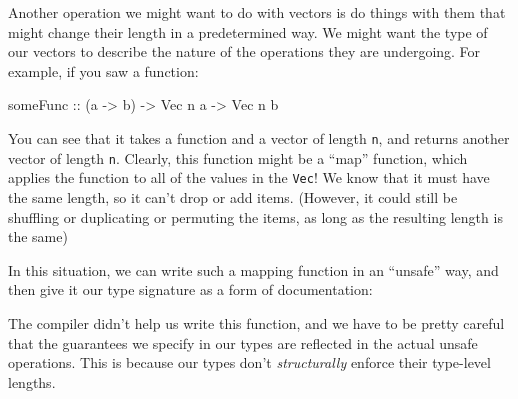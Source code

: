 \documentclass[]{article}
\newenvironment{Shaded}{}{}
\newcommand{\CommentTok}[1]{\textcolor[rgb]{0.38,0.63,0.69}{\textit{#1}}}
\newcommand{\DataTypeTok}[1]{\textcolor[rgb]{0.56,0.13,0.00}{#1}}
\newcommand{\FunctionTok}[1]{\textcolor[rgb]{0.02,0.16,0.49}{#1}}
\newcommand{\KeywordTok}[1]{\textcolor[rgb]{0.00,0.44,0.13}{\textbf{#1}}}
\newcommand{\NormalTok}[1]{#1}
\newcommand{\OperatorTok}[1]{\textcolor[rgb]{0.40,0.40,0.40}{#1}}
\newcommand{\OtherTok}[1]{\textcolor[rgb]{0.00,0.44,0.13}{#1}}
\begin{document}
Another operation we might want to do with vectors is do things with them that
might change their length in a predetermined way. We might want the type of our
vectors to describe the nature of the operations they are undergoing. For
example, if you saw a function:

\begin{Shaded}
\begin{Highlighting}[]
\OtherTok{someFunc ::}\NormalTok{ (a }\OtherTok{{-}>}\NormalTok{ b) }\OtherTok{{-}>} \DataTypeTok{Vec}\NormalTok{ n a }\OtherTok{{-}>} \DataTypeTok{Vec}\NormalTok{ n b}
\end{Highlighting}
\end{Shaded}

You can see that it takes a function and a vector of length \texttt{n}, and
returns another vector of length \texttt{n}. Clearly, this function might be a
``map'' function, which applies the function to all of the values in the
\texttt{Vec}! We know that it must have the same length, so it can't drop or add
items. (However, it could still be shuffling or duplicating or permuting the
items, as long as the resulting length is the same)

In this situation, we can write such a mapping function in an ``unsafe'' way,
and then give it our type signature as a form of documentation:

\begin{Shaded}
\end{Shaded}

The compiler didn't help us write this function, and we have to be pretty
careful that the guarantees we specify in our types are reflected in the actual
unsafe operations. This is because our types don't \emph{structurally} enforce
their type-level lengths.
\end{document}
